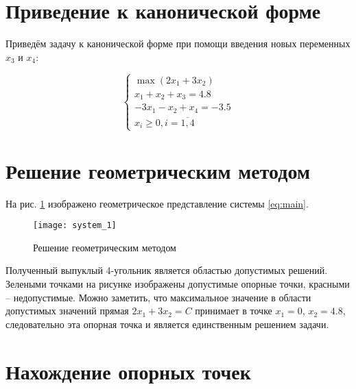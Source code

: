 \section{Приведение к канонической форме}

Приведём задачу к канонической форме при помощи введения новых переменных $x_3$ и $x_4$:

\begin{equation}
\begin{cases}
	\max \left( 2 x_1 + 3 x_2 \right) \\
	x_1 + x_2 + x_3 = 4.8 \\
	-3 x_1 - x_2 + x_4 = -3.5 \\
	x_i \ge 0, i = \overline{1,4}
\end{cases}
\end{equation}

\section{Решение геометрическим методом}

На рис. \ref{pic:geometric_solution} изображено геометрическое представление системы \ref{eq:main}.

\begin{figure}[H]
\begin{center}
	\texttt{[image: system\_1]}
	\caption{Решение геометрическим методом}
	\label{pic:geometric_solution}
\end{center}
\end{figure}

Полученный выпуклый 4-угольник является областью допустимых решений. Зелеными точками на рисунке изображены допустимые опорные точки, красными -- недопустимые. Можно заметить, что максимальное значение в области допустимых значений прямая $2x_1 + 3x_2 = C$ принимает в точке $x_1 = 0$, $x_2 = 4.8$, следовательно эта опорная точка и является единственным решением задачи.

\section{Нахождение опорных точек}

